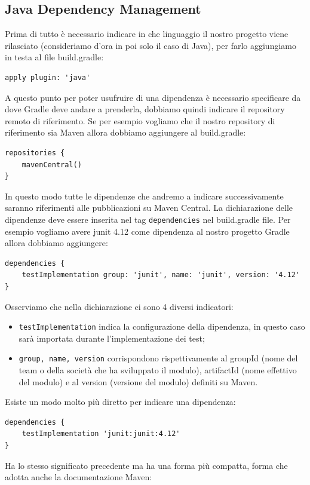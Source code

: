 \subsection{Java Dependency Management}
Prima di tutto è necessario indicare in che linguaggio il nostro progetto viene rilasciato (consideriamo d'ora in poi solo il caso di Java), per farlo aggiungiamo in testa al file build.gradle:
\begin{lstlisting}[frame=single]
apply plugin: 'java' \end{lstlisting}
A questo punto per poter usufruire di una dipendenza è necessario specificare da dove Gradle deve andare a prenderla, dobbiamo quindi indicare il repository remoto di riferimento. Se per esempio vogliamo che il nostro repository di riferimento sia Maven allora dobbiamo aggiungere al build.gradle:
\begin{lstlisting}[frame=single]
repositories {
    mavenCentral()
} \end{lstlisting}
In questo modo tutte le dipendenze che andremo a indicare successivamente saranno riferimenti alle pubblicazioni su Maven Central. La dichiarazione delle dipendenze deve essere inserita nel tag \texttt{dependencies} nel build.gradle file. Per esempio vogliamo avere junit 4.12 come dipendenza al nostro progetto Gradle allora dobbiamo aggiungere:
\begin{lstlisting}[frame=single]
dependencies {
    testImplementation group: 'junit', name: 'junit', version: '4.12' 
} \end{lstlisting}
Osserviamo che nella dichiarazione ci sono 4 diversi indicatori:
\begin{itemize}
    \item \texttt{testImplementation} indica la configurazione della dipendenza, in questo caso sarà importata durante l'implementazione dei test;
    \item \texttt{group, name, version} corrispondono rispettivamente al groupId (nome del team o della società che ha sviluppato il modulo), artifactId (nome effettivo del modulo) e al version (versione del modulo) definiti su Maven.
\end{itemize}
Esiste un modo molto più diretto per indicare una dipendenza:
\begin{lstlisting}[frame=single]
dependencies {
    testImplementation 'junit:junit:4.12'
} \end{lstlisting}
Ha lo stesso significato precedente ma ha una forma più compatta, forma che adotta anche la documentazione Maven:
